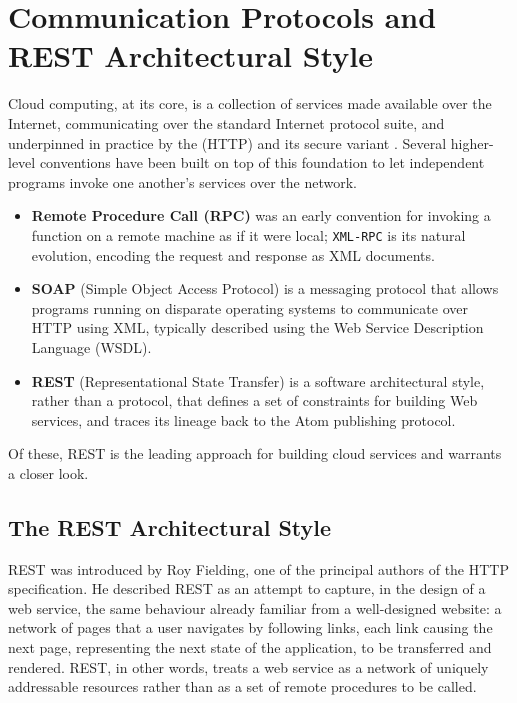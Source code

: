 \section{Communication Protocols and REST Architectural Style} \label{sec:communication_protocols}

Cloud computing, at its core, is a collection of services made available over the Internet, communicating over the standard Internet protocol suite, and underpinned in practice by the  (HTTP) and its secure variant . Several higher-level conventions have been built on top of this foundation to let independent programs invoke one another's services over the network.

\begin{itemize}
    \item \textbf{Remote Procedure Call (RPC)} was an early convention for invoking a function on a remote machine as if it were local; \texttt{XML-RPC} is its natural evolution, encoding the request and response as XML documents.
    \item \textbf{SOAP} (Simple Object Access Protocol) is a messaging protocol that allows programs running on disparate operating systems to communicate over HTTP using XML, typically described using the Web Service Description Language (WSDL).
    \item \textbf{REST} (Representational State Transfer) is a software architectural style, rather than a protocol, that defines a set of constraints for building Web services, and traces its lineage back to the Atom publishing protocol.
\end{itemize}

Of these, REST is the leading approach for building cloud services and warrants a closer look.

\subsection{The REST Architectural Style} \label{subsec:rest_style}

REST was introduced by Roy Fielding, one of the principal authors of the HTTP specification. He described REST as an attempt to capture, in the design of a web service, the same behaviour already familiar from a well-designed website: a network of pages that a user navigates by following links, each link causing the next page, representing the next state of the application, to be transferred and rendered. REST, in other words, treats a web service as a network of uniquely addressable resources rather than as a set of remote procedures to be called.

